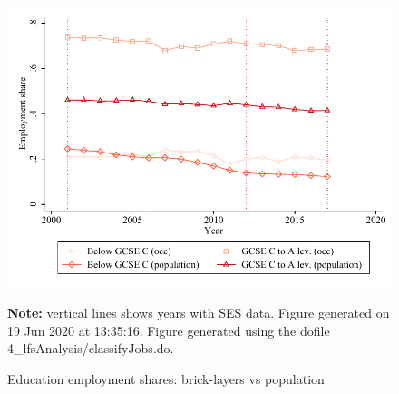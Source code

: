 \begin{figure}[!h]
\centering
\caption{Education employment shares: brick-layers vs population}
\includegraphics[width=.6666666666666666\textwidth]{../output/brick_layers}
\par \begin{minipage}[h]{\textwidth}{\scriptsize\textbf{Note:} vertical lines shows years with SES data. Figure generated on 19 Jun 2020 at 13:35:16. Figure generated using the dofile 4\_lfsAnalysis/classifyJobs.do.}\end{minipage}
\end{figure}
